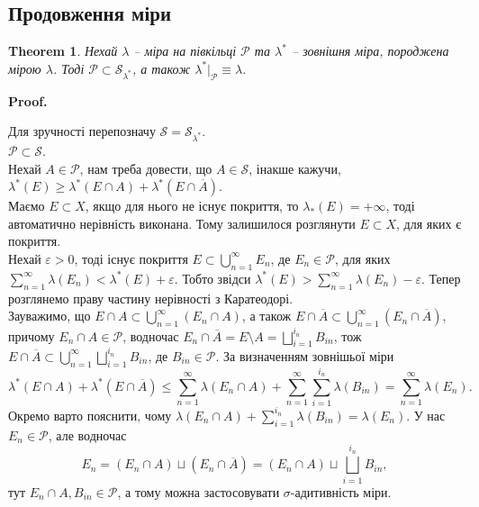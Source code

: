 \documentclass[a4paper, 10pt]{article}
\makeatletter
\theoremstyle{theoremdd}
\newtheorem{theorem}{Theorem}[subsection]
\renewenvironment{proof}[1][Proof.\\]{\par
\pushQED{\hfill \qed}%
\normalfont \topsep6\p@\@plus6\p@\relax
\trivlist
\item\relax
{\bfseries
#1\@addpunct{.}}\hspace\labelsep\ignorespaces
}{%
\popQED\endtrivlist\@endpefalse
}
\makeatother
\begin{document}
\subsection{Продовження міри}
\begin{theorem}
Нехай $\lambda$ -- міра на півкільці $\mathcal{P}$ та $\lambda^*$ -- зовнішня міра, породжена мірою $\lambda$. Тоді $\mathcal{P} \subset \mathcal{S}_{\lambda^*}$, а також $\lambda^*|_\mathcal{P} \equiv \lambda$.
\end{theorem}

\begin{proof}
Для зручності перепозначу $\mathcal{S} = \mathcal{S}_{\lambda^*}$.
\bigskip \\
$\mathcal{P} \subset \mathcal{S}$.\\
Нехай $A \in \mathcal{P}$, нам треба довести, що $A \in \mathcal{S}$, інакше кажучи, $\lambda^*(E) \geq \lambda^*(E \cap A) + \lambda^*(E \cap \overline{A})$.\\
Маємо $E \subset X$, якщо для нього не існує покриття, то $\lambda_*(E) = +\infty$, тоді автоматично нерівність виконана. Тому залишилося розглянути $E \subset X$, для яких є покриття.\\
Нехай $\varepsilon > 0$, тоді існує покриття $E \subset \displaystyle\bigcup_{n=1}^\infty E_n$, де $E_n \in \mathcal{P}$, для яких $\displaystyle\sum_{n=1}^\infty \lambda(E_n) < \lambda^*(E) + \varepsilon$. Тобто звідси $\lambda^*(E) > \displaystyle\sum_{n=1}^\infty \lambda(E_n) - \varepsilon$. Тепер розглянемо праву частину нерівності з Каратеодорі.\\
Зауважимо, що $E \cap A \subset \displaystyle\bigcup_{n=1}^\infty (E_n \cap A)$, а також $E \cap \overline{A} \subset \displaystyle\bigcup_{n=1}^\infty (E_n \cap \overline{A})$, причому $E_n \cap A \in \mathcal{P}$, водночас $E_n \cap \overline{A} = E \setminus A = \displaystyle\bigsqcup_{i=1}^{i_n} B_{in}$, тож $E \cap \overline{A} \subset \displaystyle\bigcup_{n=1}^\infty \bigsqcup_{i=1}^{i_n} B_{in}$, де $B_{in} \in \mathcal{P}$. За визначенням зовнішьої міри
\[
\lambda^*(E \cap A) + \lambda^*(E \cap \overline{A}) \leq \displaystyle\sum_{n=1}^\infty \lambda(E_n \cap A) + \sum_{n=1}^\infty \sum_{i=1}^{i_n} \lambda(B_{in}) = \sum_{n=1}^\infty \lambda(E_n).
\]
Окремо варто пояснити, чому $\lambda(E_n \cap A) + \displaystyle\sum_{i=1}^{i_n} \lambda(B_{in}) = \lambda(E_n)$. У нас $E_n \in \mathcal{P}$, але водночас 
\[
\displaystyle E_n = (E_n \cap A) \sqcup (E_n \cap \overline{A}) = (E_n \cap A) \sqcup \bigsqcup_{i=1}^{i_n}B_{in},
\]
тут $E_n \cap A, B_{in} \in \mathcal{P}$, а тому можна застосовувати $\sigma$-адитивність міри.\\

\end{proof}
\end{document}
